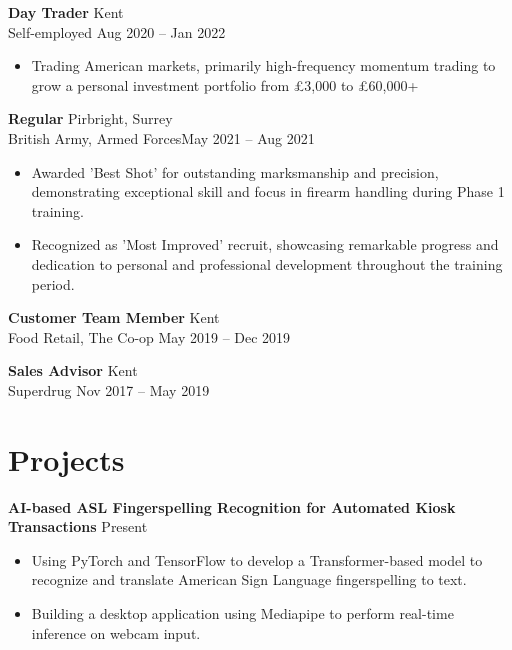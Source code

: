 \documentclass[11pt,letterpaper]{article}
\begin{document}
\textbf{Day Trader} \hfill Kent \\
Self-employed \hfill Aug 2020 -- Jan 2022 \\
\vspace{-10pt}
\begin{itemize}
  \item Trading American markets, primarily high-frequency momentum trading to grow a personal investment portfolio from £3,000 to £60,000+
\end{itemize}

\textbf{Regular} \hfill Pirbright, Surrey \\
British Army, Armed Forces\hfill May 2021 -- Aug 2021 \\
\vspace{-10pt}
\begin{itemize}
  \item Awarded 'Best Shot' for outstanding marksmanship and precision, demonstrating exceptional skill and focus in firearm handling during Phase 1 training.
  \item Recognized as 'Most Improved' recruit, showcasing remarkable progress and dedication to personal and professional development throughout the training period.
\end{itemize}

\textbf{Customer Team Member} \hfill Kent \\
Food Retail, The Co-op \hfill May 2019 -- Dec 2019 \\
\vspace{10pt}

\textbf{Sales Advisor} \hfill Kent \\
Superdrug \hfill Nov 2017 -- May 2019 \\
\vspace{10pt}

\vspace{-16.5pt}

\section*{Projects}
\textbf{AI-based ASL Fingerspelling Recognition for Automated Kiosk Transactions} \hfill Present \\
\vspace{-10pt}
\begin{itemize}
  \item Using PyTorch and TensorFlow to develop a Transformer-based model to recognize and translate American Sign Language fingerspelling to text.
  \item Building a desktop application using Mediapipe to perform real-time inference on webcam input.
\end{itemize}
\end{document}
